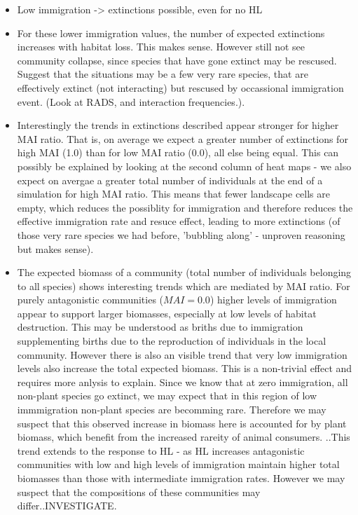 \begin{itemize}
	\item Low immigration -> extinctions possible, even for no HL
	\item For these lower immigration values, the number of expected extinctions increases with habitat loss. This makes sense. However still not see community collapse, since species that have gone extinct may be rescused. Suggest that the situations may be a few very rare species, that are effectively extinct (not interacting) but rescused by occassional immigration event. (Look at RADS, and interaction frequencies.).
	\item Interestingly the trends in extinctions described appear stronger for higher MAI ratio. That is, on average we expect a greater number of extinctions for high MAI (1.0) than for low MAI ratio (0.0), all else being equal. This can possibly be explained by looking at the second column of heat maps - we also expect on avergae a greater total number of individuals at the end of a simulation for high MAI ratio. This means that fewer landscape cells are empty, which reduces the possiblity for immigration and therefore reduces the effective immigration rate and resuce effect, leading to more extinctions (of those very rare species we had before, 'bubbling along' - unproven reasoning but makes sense).
	
	\item The expected biomass of a community (total number of individuals belonging to all species) shows interesting trends which are mediated by MAI ratio. For purely antagonistic communities ($MAI = 0.0$) higher levels of immigration appear to support larger biomasses, especially at low levels of habitat destruction. This may be understood as briths due to immigration supplementing births due to the reproduction of individuals in the local community. However there is also an visible trend that very low immigration levels also increase the total expected biomass. This is a non-trivial effect and requires more anlysis to explain. Since we know that at zero immigration, all non-plant species go extinct, we may expect that in this region of low immmigration non-plant species are becomming rare. Therefore we may suspect that this observed increase in biomass here is accounted for by plant biomass, which benefit from the increased rareity of animal consumers.  ..This trend extends to the response to HL - as HL increases antagonistic communities with low and high levels of immigration maintain higher total biomasses than those with intermediate immigration rates. However we may suspect that the compositions of these communities may differ..INVESTIGATE.
	

\end{itemize}
